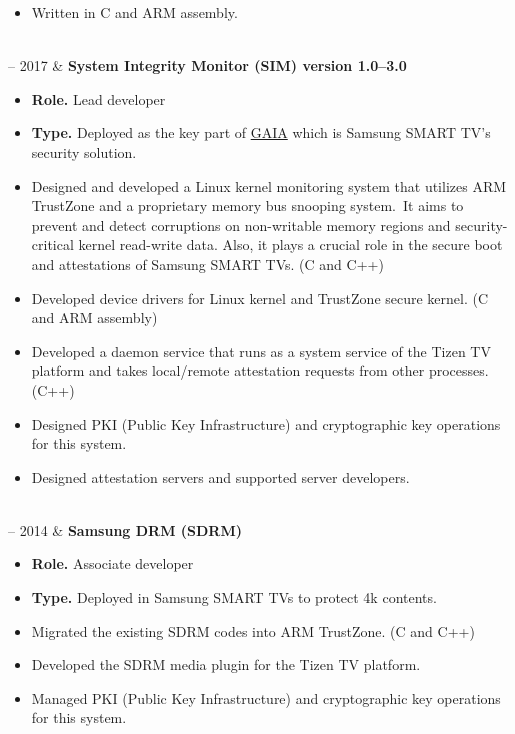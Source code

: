 \documentclass[10pt, a4paper]{article}
\newcommand{\Duration}[2]{\fontsize{9pt}{0}\selectfont #1 -- #2}
\begin{document}
\begin{EntriesTable}
\begin{itemize}
    \item Written in C and ARM assembly.
  \end{itemize}
  \\
  \Duration{2014}{2017}  &
  \textbf{System Integrity Monitor (SIM) version 1.0--3.0}
  \begin{itemize}
    \item \textbf{Role.} Lead developer
    \item \textbf{Type.} Deployed as the key part of \href{https://news.samsung.com/global/samsung-electronics-announces-gaia-a-powerful-smart-tv-security-solution-for-2016-and-beyond}{GAIA} which is Samsung SMART TV's security solution.
    \item Designed and developed a Linux kernel monitoring system that utilizes ARM TrustZone and a proprietary memory bus snooping system.\
      It aims to prevent and detect corruptions on non-writable memory regions and security-critical kernel read-write data. Also, it plays a crucial role in the secure boot and attestations of Samsung SMART TVs. (C and C++)
    \item Developed device drivers for Linux kernel and TrustZone secure kernel. (C and ARM assembly)
    \item Developed a daemon service that runs as a system service of the Tizen TV platform and takes local/remote attestation requests from other processes. (C++)
    \item Designed PKI (Public Key Infrastructure) and cryptographic key operations for this system.
    \item Designed attestation servers and supported server developers.
  \end{itemize}
  \\
  \Duration{2013}{2014}  &
  \textbf{Samsung DRM (SDRM)}
  \begin{itemize}
    \item \textbf{Role.} Associate developer
    \item \textbf{Type.} Deployed in Samsung SMART TVs to protect 4k contents.
    \item Migrated the existing SDRM codes into ARM TrustZone. (C and C++)
    \item Developed the SDRM media plugin for the Tizen TV platform.
    \item Managed PKI (Public Key Infrastructure) and cryptographic key operations for this system.
  \end{itemize}
\end{EntriesTable}
\end{document}
